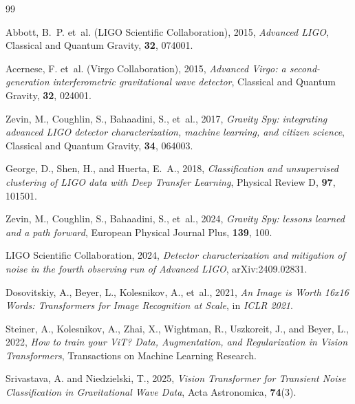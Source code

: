 \documentclass[12pt]{article}
\begin{document}
\begin{thebibliography}{99}

Abbott, B.~P. et~al. (LIGO Scientific Collaboration), 2015,
\emph{Advanced LIGO},
Classical and Quantum Gravity, \textbf{32}, 074001.

Acernese, F. et~al. (Virgo Collaboration), 2015,
\emph{Advanced Virgo: a second-generation interferometric gravitational wave detector},
Classical and Quantum Gravity, \textbf{32}, 024001.

Zevin, M., Coughlin, S., Bahaadini, S., et~al., 2017,
\emph{Gravity Spy: integrating advanced LIGO detector characterization, machine learning, and citizen science},
Classical and Quantum Gravity, \textbf{34}, 064003.

George, D., Shen, H., and Huerta, E.~A., 2018,
\emph{Classification and unsupervised clustering of LIGO data with Deep Transfer Learning},
Physical Review D, \textbf{97}, 101501.

Zevin, M., Coughlin, S., Bahaadini, S., et~al., 2024,
\emph{Gravity Spy: lessons learned and a path forward},
European Physical Journal Plus, \textbf{139}, 100.

LIGO Scientific Collaboration, 2024,
\emph{Detector characterization and mitigation of noise in the fourth observing run of Advanced LIGO},
arXiv:2409.02831.

Dosovitskiy, A., Beyer, L., Kolesnikov, A., et~al., 2021,
\emph{An Image is Worth 16x16 Words: Transformers for Image Recognition at Scale},
in \emph{ICLR 2021}.

Steiner, A., Kolesnikov, A., Zhai, X., Wightman, R., Uszkoreit, J., and Beyer, L., 2022,
\emph{How to train your ViT? Data, Augmentation, and Regularization in Vision Transformers},
Transactions on Machine Learning Research.

Srivastava, A. and Niedzielski, T., 2025,
\emph{Vision Transformer for Transient Noise Classification in Gravitational Wave Data},
Acta Astronomica, \textbf{74}(3).


\end{thebibliography}
\end{document}
